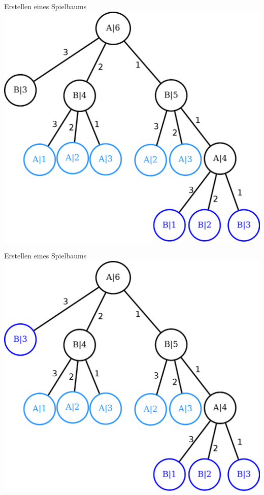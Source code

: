 \documentclass[18pt]{beamer}
\begin{document}
\begin{frame}{Erstellen eines Spielbaums}
\includegraphics[scale=0.4]{baum13.png}
\end{frame}

\begin{frame}{Erstellen eines Spielbaums}
\includegraphics[scale=0.4]{baum14.png}
\end{frame}
\end{document}
